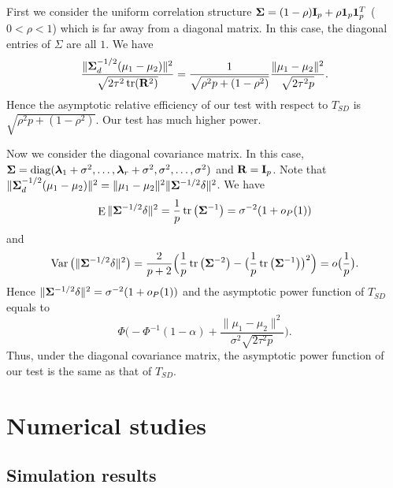 \documentclass[review]{elsarticle}
\DeclareMathOperator{\mytr}{tr}
\DeclareMathOperator{\mydiag}{diag}
\DeclareMathOperator{\myE}{E}
\DeclareMathOperator{\myVar}{Var}
\newcommand{\bfsym}[1]{\ensuremath{\boldsymbol{#1}}}
\def\blambda {\bfsym {\lambda}}        \def\bLambda {\bfsym {\Lambda}}
\theoremstyle{plain}
\theoremstyle{definition}
\theoremstyle{remark}
\begin{document}
 First we consider the uniform correlation structure $\bSigma=(1-\rho)\BI_p+\rho \mathbf{1}_p\mathbf{1}_p^T$ ($0<\rho <1$) which is far away from a diagonal matrix.
 In this case, the diagonal entries of $\Sigma$ are all $1$. 
 We have
 $$
 \frac{\|\bSigma_d^{-1/2}(\mu_1-\mu_2)\|^2}{\sqrt{2\tau^2\mytr(\BR^2)}}
 =
 \frac{1}{\sqrt{\rho^2 p +(1-\rho^2)}}\frac{\|\mu_1-\mu_2\|^2}{\sqrt{2\tau^2p}}.
 $$
 Hence the asymptotic relative efficiency of our test with respect to $T_{SD}$ is
 $\sqrt{\rho^2 p +(1-\rho^2)}$.
 Our test has much higher power.

 Now we consider the diagonal covariance matrix. 
 In this case, $\bSigma=\mydiag(\blambda_1+\sigma^2,\ldots,\blambda_r+\sigma^2,\sigma^2,\ldots,\sigma^2)$ and $\mathbf{R}=\mathbf{I}_p$.
 Note that $\|\bSigma_d^{-1/2}(\mu_1-\mu_2)\|^2=\|\mu_1-\mu_2\|^2 \|\bSigma^{-1/2}\delta\|^2$.
 We have 
 $$\myE\|\bSigma^{-1/2}\delta\|^2=
 \frac{1}{p}\mytr\big(\bSigma^{-1}\big)
 =\sigma^{-2} (1+o_P(1))
 $$
and
 $$
 \myVar\big( \|\bSigma^{-1/2}\delta\|^2 \big)=\frac{2}{p+2}\Big(\frac{1}{p}\mytr\big(\bSigma^{-2}\big)-\big(\frac{1}{p}\mytr\big(\bSigma^{-1}\big)\big)^2\Big)=o\big(\frac{1}{p}\big).$$
 Hence $\|\bSigma^{-1/2}\delta\|^2=\sigma^{-2}(1+o_P(1))$ and the asymptotic power function of $T_{SD}$ equals to
 $$
        \Phi\Big(-\Phi^{-1}(1-\alpha)+\frac{\|\mu_1-\mu_2\|^2}{\sigma^2\sqrt{2\tau^2 p}}\Big).
 $$
 Thus, under the diagonal covariance matrix, the asymptotic power function of our test is the same as that of $T_{SD}$.






\section{Numerical studies}
\subsection{Simulation results}
\end{document}
